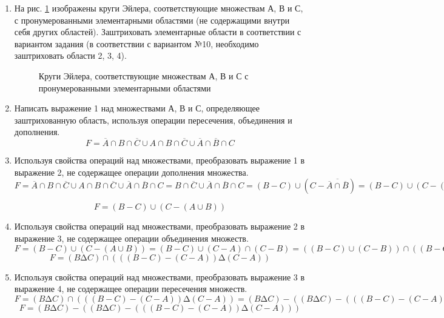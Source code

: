\documentclass[a4paper,14pt]{extarticle}
\begin{document}
	\begin{enumerate}[№1. ]
		\item На рис. \ref{ris:image} изображены круги Эйлера, соответствующие множествам А, В и С, с пронумерованными элементарными областями (не	содержащими внутри себя других областей). Заштриховать элементарные области в соответствии с вариантом задания (в соответствии с вариантом №10, необходимо заштриховать области 2, 3, 4).\\
		 \begin{figure}[h]
		    \caption{Круги Эйлера, соответствующие множествам А, В и С
		 		с пронумерованными элементарными областями}
		 	\label{ris:image}
		 \end{figure}
		 \item Написать выражение 1 над множествами А, В и С, определяющее заштрихованную область, используя операции пересечения, объединения и дополнения.\\
		 \begin{equation}F=\overline{A}\cap B\cap\overline{C}\cup A\cap B\cap\overline{C}\cup\overline{A}\cap\overline{B}\cap C\end{equation}
		 \item Используя свойства операций над множествами, преобразовать выражение 1 в выражение 2, не содержащее операции дополнения множества.\\
		 $F=\overline{A}\cap B\cap \overline{C}\cup A\cap B\cap \overline{C}\cup \overline{A}\cap \overline{B}\cap C=B\cap \overline{C}\cup \overline{A}\cap \overline{B}\cap C=(B-C)\cup(C-\overline{\overline{A}\cap \overline{B}})=(B-C)\cup(C-(A\cup B))$

		 
		 \begin{equation}F=(B-C)\cup(C-(A\cup B))\end{equation}
		 \item Используя свойства операций над множествами, преобразовать выражение 2 в выражение 3, не содержащее операции объединения множеств.\\
		 $F=(B-C)\cup(C-(A\cup B))=(B-C) \cup (C - A) \cap (C - B) = ((B - C) \cup (C - B)) \cap ((B - C) \cup (C - A)) = (B ∆ C)\cap ((B - C) \cup (C - A)) = (B ∆ C)\cap (((B - C) - (C - A))  ∆ (C - A))$
		 \begin{equation}F=(B ∆ C)\cap (((B - C) - (C - A))  ∆ (C - A))\end{equation}
		 \item Используя свойства операций над множествами, преобразовать выражение 3 в выражение 4, не содержащее операции пересечения множеств.\\
		 $F=(B ∆ C)\cap (((B - C) - (C - A))  ∆ (C - A))=(B ∆ C) - ((B ∆ C) - (((B - C) - (C - A))  ∆ (C - A)))$
		 \begin{equation}F=(B ∆ C) - ((B ∆ C) - (((B - C) - (C - A))  ∆ (C - A)))\end{equation}
	 		

\end{enumerate}
\end{document}
